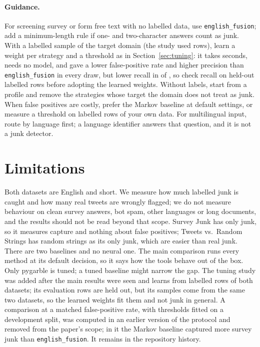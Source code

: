 \documentclass[10pt,twocolumn]{article}
\newcommand{\code}[1]{\texttt{#1}}
\newcommand{\SJ}{Survey Junk}
\newcommand{\TRS}{Tweets vs.\ Random Strings}
\begin{document}
\paragraph{Guidance.} For screening survey or form free text with no
labelled data, use \code{english\_fusion}; add a minimum-length rule if
one- and two-character answers count as junk. With a labelled sample of
the target domain (the study used \nTune{} rows), learn a weight per
strategy and a threshold as in Section~\ref{sec:tuning}: it takes seconds,
needs no model, and gave a lower false-positive rate and higher precision
than \code{english\_fusion} in every draw, but lower recall in
\tuningrecalllower{} of \tuningdraws{}, so check recall on held-out
labelled rows before adopting the learned weights. Without labels, start from a profile and remove the
strategies whose target the domain does not treat as junk. When false positives are costly,
prefer the Markov baseline at default settings, or measure a threshold on
labelled rows of your own data. For multilingual input, route by language
first; a language identifier answers that question, and it is not a junk
detector.

\section{Limitations}
\label{sec:limitations}

Both datasets are English and short. We measure how much labelled junk
is caught and how many real tweets are wrongly flagged; we do not measure
behaviour on clean survey answers, bot spam, other languages or long
documents, and the results should not be read beyond that scope. \SJ{} has only junk, so it
measures capture and nothing about false positives; \TRS{} has random
strings as its only junk, which are easier than real junk. There are two
baselines and no neural one. The main comparison runs every method at its
default decision, so it says how the tools behave out of the box. Only
pygarble is tuned; a tuned baseline might narrow the gap. The tuning
study was added after the main results were seen and learns from labelled
rows of both datasets; its evaluation rows are held out, but its samples
come from the same two datasets, so the learned weights fit them and not
junk in general. A comparison at a matched
false-positive rate, with thresholds fitted on a development split, was
computed in an earlier version of the protocol and removed from the
paper's scope; in it the Markov baseline captured more survey junk than
\code{english\_fusion}. It remains in the repository history.
\end{document}
